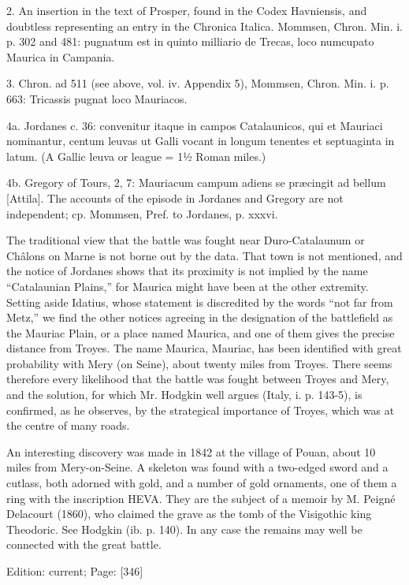 2. An insertion in the text of Prosper, found in the Codex Havniensis, and doubtless representing an entry in the Chronica Italica. Mommsen, Chron. Min. i. p. 302 and 481: pugnatum est in quinto milliario de Trecas, loco numcupato Maurica in Campania.

3. Chron. ad 511 (see above, vol. iv. Appendix 5), Mommsen, Chron. Min. i. p. 663: Tricassis pugnat loco Mauriacos.

4a. Jordanes c. 36: convenitur itaque in campos Catalaunicos, qui et Mauriaci nominantur, centum leuvas ut Galli vocant in longum tenentes et septuaginta in latum. (A Gallic leuva or league = 1½ Roman miles.)

4b. Gregory of Tours, 2, 7: Mauriacum campum adiens se præcingit ad bellum [Attila]. The accounts of the episode in Jordanes and Gregory are not independent; cp. Mommsen, Pref. to Jordanes, p. xxxvi.

The traditional view that the battle was fought near Duro-Catalaunum or Châlons on Marne is not borne out by the data. That town is not mentioned, and the notice of Jordanes shows that its proximity is not implied by the name \texthebrew{“}Catalaunian Plains,\texthebrew{}” for Maurica might have been at the other extremity. Setting aside Idatius, whose statement is discredited by the words \texthebrew{“}not far from Metz,\texthebrew{}” we find the other notices agreeing in the designation of the battlefield as the Mauriac Plain, or a place named Maurica, and one of them gives the precise distance from Troyes. The name Maurica, Mauriac, has been identified with great probability with Mery (on Seine), about twenty miles from Troyes. There seems therefore every likelihood that the battle was fought between Troyes and Mery, and the solution, for which Mr. Hodgkin well argues (Italy, i. p. 143-5), is confirmed, as he observes, by the strategical importance of Troyes, which was at the centre of many roads.

An interesting discovery was made in 1842 at the village of Pouan, about 10 miles from Mery-on-Seine. A skeleton was found with a two-edged sword and a cutlass, both adorned with gold, and a number of gold ornaments, one of them a ring with the inscription HEVA. They are the subject of a memoir by M. Peigné Delacourt (1860), who claimed the grave as the tomb of the Visigothic king Theodoric. See Hodgkin (ib. p. 140). In any case the remains may well be connected with the great battle.

Edition: current; Page: [346]

